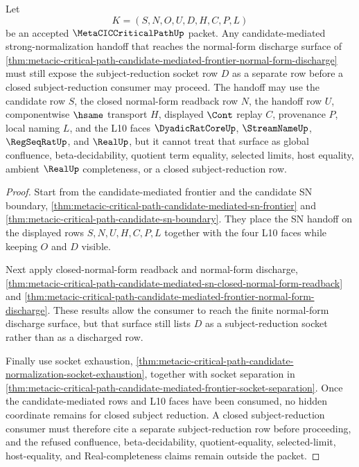 \begin{theorem}
\label{thm:metacic-critical-path-candidate-mediated-frontier-subject-reduction-socket}
Let
$$
K=(S,N,O,U,D,H,C,P,L)
$$
be an accepted $\MetaCICCriticalPathUp$ packet. Any candidate-mediated strong-normalization handoff that reaches the normal-form discharge surface of \autoref{thm:metacic-critical-path-candidate-mediated-frontier-normal-form-discharge} must still expose the subject-reduction socket row $D$ as a separate row before a closed subject-reduction consumer may proceed. The handoff may use the candidate row $S$, the closed normal-form readback row $N$, the handoff row $U$, componentwise $\hsame$ transport $H$, displayed $\Cont$ replay $C$, provenance $P$, local naming $L$, and the L10 faces $\DyadicRatCoreUp$, $\StreamNameUp$, $\RegSeqRatUp$, and $\RealUp$, but it cannot treat that surface as global confluence, beta-decidability, quotient term equality, selected limits, host equality, ambient $\RealUp$ completeness, or a closed subject-reduction row.
\end{theorem}
\begin{proof}
Start from the candidate-mediated frontier and the candidate SN boundary, \autoref{thm:metacic-critical-path-candidate-mediated-sn-frontier} and \autoref{thm:metacic-critical-path-candidate-sn-boundary}. They place the SN handoff on the displayed rows $S,N,U,H,C,P,L$ together with the four L10 faces while keeping $O$ and $D$ visible.

Next apply closed-normal-form readback and normal-form discharge, \autoref{thm:metacic-critical-path-candidate-mediated-sn-closed-normal-form-readback} and \autoref{thm:metacic-critical-path-candidate-mediated-frontier-normal-form-discharge}. These results allow the consumer to reach the finite normal-form discharge surface, but that surface still lists $D$ as a subject-reduction socket rather than as a discharged row.

Finally use socket exhaustion, \autoref{thm:metacic-critical-path-candidate-normalization-socket-exhaustion}, together with socket separation in \autoref{thm:metacic-critical-path-candidate-mediated-frontier-socket-separation}. Once the candidate-mediated rows and L10 faces have been consumed, no hidden coordinate remains for closed subject reduction. A closed subject-reduction consumer must therefore cite a separate subject-reduction row before proceeding, and the refused confluence, beta-decidability, quotient-equality, selected-limit, host-equality, and Real-completeness claims remain outside the packet.
\end{proof}

